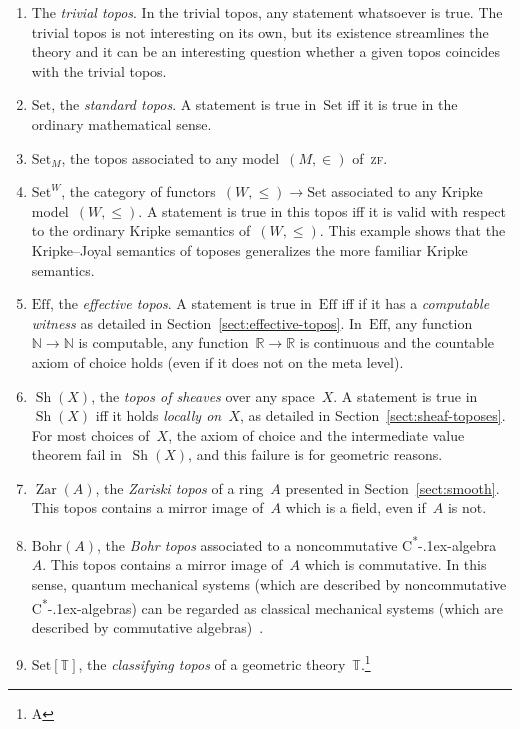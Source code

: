 \documentclass[oneside,reqno]{amsart}
\theoremstyle{definition}
\theoremstyle{plain}
\theoremstyle{remark}
\newcommand{\NN}{\mathbb{N}}
\newcommand{\TT}{\mathbb{T}}
\newcommand{\RR}{\mathbb{R}}
\DeclareMathOperator{\Sh}{Sh}
\DeclareMathOperator{\Zar}{Zar}
\newcommand{\Set}{\mathrm{Set}}
\newcommand{\Eff}{\mathrm{Ef{}f}}
\renewcommand{\_}{\mathpunct{.}\,}
\newcommand{\effective}{ef{}fective\xspace}
\newcommand{\?}{\,{:}\,}
\begin{document}
\begin{enumerate}
\item The \emph{trivial topos}. In the trivial topos, any statement whatsoever
is true. The trivial topos is not interesting on its own, but its existence
streamlines the theory and it can be an interesting question whether a given
topos coincides with the trivial topos.
\item $\Set$, the \emph{standard topos}. A statement is true in~$\Set$ iff it is true
in the ordinary mathematical sense.
\item $\Set_M$, the topos associated to any model~$(M,\in)$ of~\textsc{zf}.
\item $\Set^W$, the category of functors~$(W,\leq) \to \Set$ associated to
any Kripke model~$(W,\leq)$. A statement is true in this topos iff it is valid
with respect to the ordinary Kripke semantics of~$(W,\leq)$. This example shows
that the Kripke--Joyal semantics of toposes generalizes the more familiar
Kripke semantics.
\item $\Eff$, the \emph{\effective topos}. A statement is true in~$\Eff$ iff
if it has a \emph{computable witness} as detailed in
Section~\ref{sect:effective-topos}. In~$\Eff$, any function~$\NN \to \NN$ is
computable, any function~$\RR \to \RR$ is continuous and the countable axiom of
choice holds (even if it does not on the meta level).
\item $\Sh(X)$, the \emph{topos of sheaves} over any space~$X$. A statement is true
in~$\Sh(X)$ iff it holds \emph{locally on~$X$}, as detailed in
Section~\ref{sect:sheaf-toposes}. For most choices of~$X$, the
axiom of choice and the intermediate value theorem fail in~$\Sh(X)$, and this
failure is for geometric reasons.
\item $\Zar(A)$, the \emph{Zariski topos} of a ring~$A$ presented in
Section~\ref{sect:smooth}. This topos contains a mirror
image of~$A$ which is a field, even if~$A$ is not.
\item $\mathrm{Bohr}(A)$, the \emph{Bohr topos} associated to a noncommutative
C\textsuperscript{*}\kern-.1ex-algebra~$A$. This topos contains a mirror image
of~$A$ which is commutative. In this sense, quantum mechanical systems (which are
described by noncommutative C\textsuperscript{*}\kern-.1ex-algebras) can be
regarded as classical mechanical systems (which are described by commutative
algebras)~\cite{butterfield-hamilton-isham:bohr,heunen-landsman-spitters:aqt}.
\item $\Set[\TT]$, the \emph{classifying topos} of a geometric theory~$\TT$.\footnote{A
}
\end{enumerate}
\end{document}

